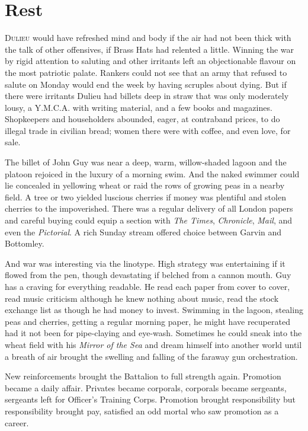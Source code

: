 \chapter*{\textsf{Rest}}

D\textsc{ulieu} would have refreshed mind and body if the air had not been thick with the talk of other offensives, if Brass Hats had relented a little. Winning the war by rigid attention to saluting and other irritants left an objectionable flavour on the most patriotic palate. Rankers could not see that an army that refused to salute on Monday would end the week by having scruples about dying. But if there were irritants Dulieu had billets deep in straw that was only moderately lousy, a Y.M.C.A. with writing material, and a few books and magazines. Shopkeepers and householders abounded, eager, at contraband prices, to do illegal trade in civilian bread; women there were with coffee, and even love, for sale.

The billet of John Guy was near a deep, warm, willow-shaded lagoon and the platoon rejoiced in the luxury of a morning swim. And the naked swimmer could lie concealed in yellowing wheat or raid the rows of growing peas in a nearby field. A tree or two yielded luscious cherries if money was plentiful and stolen cherries to the impoverished. There was a regular delivery of all London papers and careful buying could equip a section with \textit{The Times}, \textit{Chronicle}, \textit{Mail}, and even the \textit{Pictorial}. A rich Sunday stream offered choice between Garvin and Bottomley.

And war was interesting via the linotype. High strategy was entertaining if it flowed from the pen, though devastating if belched from a cannon mouth. Guy has a craving for everything readable. He read each paper from cover to cover, read music criticism although he knew nothing about music, read the stock exchange list as though he had money to invest. Swimming in the lagoon, stealing peas and cherries, getting a regular morning paper, he might have recuperated had it not been for pipe-claying and eye-wash. Sometimes he could sneak into the wheat field with his \textit{Mirror of the Sea} and dream himself into another world until a breath of air brought the swelling and falling of the faraway gun orchestration.

New reinforcements brought the Battalion to full strength again. Promotion became a daily affair. Privates became corporals, corporals became sergeants, sergeants left for Officer's Training Corps. Promotion brought responsibility but responsibility brought pay, satisfied an odd mortal who saw promotion as a career.

